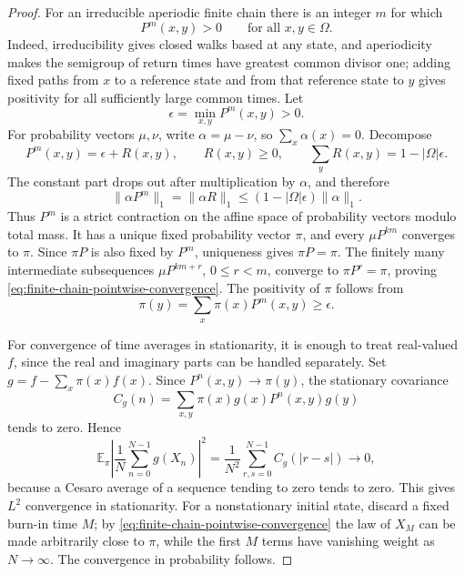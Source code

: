 \begin{proof}
For an irreducible aperiodic finite chain there is an integer \(m\) for which
\begin{equation}
  P^m(x,y)>0\qquad\text{for all }x,y\in\Omega .
  \label{eq:finite-chain-primitive-power}
\end{equation}
Indeed, irreducibility gives closed walks based at any state, and
aperiodicity makes the semigroup of return times have greatest common divisor
one; adding fixed paths from \(x\) to a reference state and from that
reference state to \(y\) gives positivity for all sufficiently large common
times.  Let
\[
  \epsilon=\min_{x,y}P^m(x,y)>0 .
\]
For probability vectors \(\mu,\nu\), write \(\alpha=\mu-\nu\), so
\(\sum_x\alpha(x)=0\).  Decompose
\[
  P^m(x,y)=\epsilon+R(x,y),
  \qquad
  R(x,y)\geq0,
  \qquad
  \sum_y R(x,y)=1-|\Omega|\epsilon .
\]
The constant part drops out after multiplication by \(\alpha\), and therefore
\begin{equation}
  \|\alpha P^m\|_1
  =
  \|\alpha R\|_1
  \leq
  (1-|\Omega|\epsilon)\|\alpha\|_1 .
  \label{eq:finite-chain-l1-contraction}
\end{equation}
Thus \(P^m\) is a strict contraction on the affine space of probability
vectors modulo total mass.  It has a unique fixed probability vector
\(\pi\), and every \(\mu P^{km}\) converges to \(\pi\).  Since \(\pi P\) is
also fixed by \(P^m\), uniqueness gives \(\pi P=\pi\).  The finitely many
intermediate subsequences \(\mu P^{km+r}\), \(0\leq r<m\), converge to
\(\pi P^r=\pi\), proving \eqref{eq:finite-chain-pointwise-convergence}.  The
positivity of \(\pi\) follows from
\[
  \pi(y)=\sum_x\pi(x)P^m(x,y)\geq\epsilon .
\]

For convergence of time averages in stationarity, it is enough to treat
real-valued \(f\), since the real and imaginary parts can be handled
separately.  Set \(g=f-\sum_x\pi(x)f(x)\).  Since
\(P^n(x,y)\to\pi(y)\), the stationary covariance
\[
  C_g(n)=\sum_{x,y}\pi(x)g(x)P^n(x,y)g(y)
\]
tends to zero.  Hence
\begin{equation}
  \mathbb E_\pi\left|\frac1N\sum_{n=0}^{N-1}g(X_n)\right|^2
  =
  \frac1{N^2}\sum_{r,s=0}^{N-1} C_g(|r-s|)
  \longrightarrow0,
  \label{eq:finite-chain-l2-average-proof}
\end{equation}
because a Cesaro average of a sequence tending to zero tends to zero.  This
gives \(L^2\) convergence in stationarity.  For a nonstationary initial
state, discard a fixed burn-in time \(M\); by
\eqref{eq:finite-chain-pointwise-convergence} the law of \(X_M\) can be made
arbitrarily close to \(\pi\), while the first \(M\) terms have vanishing
weight as \(N\to\infty\).  The convergence in probability follows.
\end{proof}

